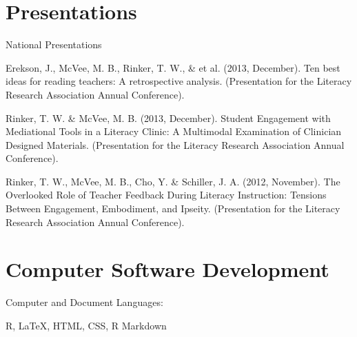 \halfblankline

\section{Presentations}
National Presentations
\begin{innerlist}

\item Erekson, J., McVee, M. B., Rinker, T. W., \& et al. (2013, December). Ten best ideas for reading teachers: A retrospective analysis. (Presentation for the Literacy Research Association Annual Conference).

\item Rinker, T. W. \& McVee, M. B. (2013, December).  Student Engagement with Mediational Tools in a Literacy Clinic: A Multimodal Examination of Clinician Designed Materials.  (Presentation for the Literacy Research Association Annual Conference).

\item Rinker, T. W., McVee, M. B., Cho, Y. \& Schiller, J. A. (2012, November).  The Overlooked Role of Teacher Feedback During Literacy Instruction: Tensions Between Engagement, Embodiment, and Ipseity.  (Presentation for the Literacy Research Association Annual Conference).

\end{innerlist}




\section{Computer Software Development}
Computer and Document Languages:
%
\begin{innerlist}
    \item R, \LaTeX, HTML, CSS, R Markdown
\end{innerlist}

\halfblankline

